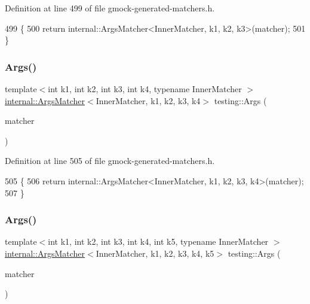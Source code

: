 Definition at line 499 of file gmock-\/generated-\/matchers.\+h.


\begin{DoxyCode}
499                                   \{
500   \textcolor{keywordflow}{return} internal::ArgsMatcher<InnerMatcher, k1, k2, k3>(matcher);
501 \}
\end{DoxyCode}
\mbox{\label{namespacetesting_aeff7e644fd00516c3519fe8c0dc1aee2}} 
\subsubsection{\texorpdfstring{Args()}{Args()}\hspace{0.1cm}{\footnotesize\ttfamily [5/11]}}
{\footnotesize\ttfamily template$<$int k1, int k2, int k3, int k4, typename Inner\+Matcher $>$ \\
\hyperlink{classtesting_1_1internal_1_1ArgsMatcher}{internal\+::\+Args\+Matcher}$<$Inner\+Matcher, k1, k2, k3, k4$>$ testing\+::\+Args (\begin{DoxyParamCaption}\item[{const Inner\+Matcher \&}]{matcher }\end{DoxyParamCaption})\hspace{0.3cm}{\ttfamily [inline]}}



Definition at line 505 of file gmock-\/generated-\/matchers.\+h.


\begin{DoxyCode}
505                                   \{
506   \textcolor{keywordflow}{return} internal::ArgsMatcher<InnerMatcher, k1, k2, k3, k4>(matcher);
507 \}
\end{DoxyCode}
\mbox{\label{namespacetesting_aede9fd33cce0d21f5e31ba10a0706827}} 
\subsubsection{\texorpdfstring{Args()}{Args()}\hspace{0.1cm}{\footnotesize\ttfamily [6/11]}}
{\footnotesize\ttfamily template$<$int k1, int k2, int k3, int k4, int k5, typename Inner\+Matcher $>$ \\
\hyperlink{classtesting_1_1internal_1_1ArgsMatcher}{internal\+::\+Args\+Matcher}$<$Inner\+Matcher, k1, k2, k3, k4, k5$>$ testing\+::\+Args (\begin{DoxyParamCaption}\item[{const Inner\+Matcher \&}]{matcher }\end{DoxyParamCaption})\hspace{0.3cm}{\ttfamily [inline]}}



